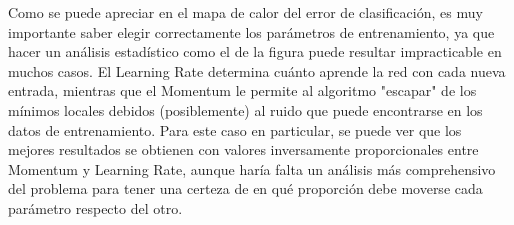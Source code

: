 \documentclass[a4paper, 11pt]{article} %
\begin{document}
\begin{figure}[H]
\captionsetup[subfigure]{justification=centering, labelformat=empty}
  \centering
\end{figure}

Como se puede apreciar en el mapa de calor del error de clasificación, es muy
importante saber elegir correctamente los parámetros de entrenamiento, ya que
hacer un análisis estadístico como el de la figura puede resultar impracticable
en muchos casos. El Learning Rate determina cuánto aprende la red con cada
nueva entrada, mientras que el Momentum le permite al algoritmo "escapar"
de los mínimos locales debidos (posiblemente) al ruido que puede encontrarse en
los datos de entrenamiento. Para este caso en particular, se puede ver que los
mejores resultados se obtienen con valores inversamente proporcionales entre
Momentum y Learning Rate, aunque haría falta un análisis más comprehensivo del
problema para tener una certeza de en qué proporción debe moverse cada
parámetro respecto del otro.
\end{document}
